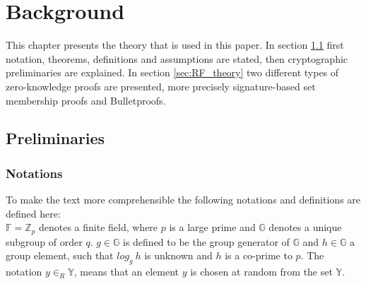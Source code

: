 \chapter{Background}
\label{ch:theory}
This chapter presents the theory that is used in this paper. In section \ref{sec:pereliminaries} first notation, theorems, definitions and assumptions  are stated, then cryptographic preliminaries are explained. In section \ref{sec:RF_theory} two different types of zero-knowledge proofs are presented, more precisely signature-based set membership proofs and Bulletproofs.

\section{Preliminaries}
\label{sec:pereliminaries}

\subsection*{Notations}
To make the text more comprehensible the following notations and definitions are defined here:
\\
$\mathds{F}=\mathds{Z}_p$ denotes a finite field, where $p$ is a large prime and $\mathds{G}$ denotes a unique subgroup of order $q$.  $g\in\mathds{G}$ is defined to be the group generator of $\mathds{G}$ and $h\in\mathds{G}$ a group element, such that  $log_g\:h$ is unknown and $h$ is a co-prime to $p$. 
The notation $y\in_R\mathds{Y}$, means that an element $y$ is chosen at random from the set $\mathds{Y}$.

